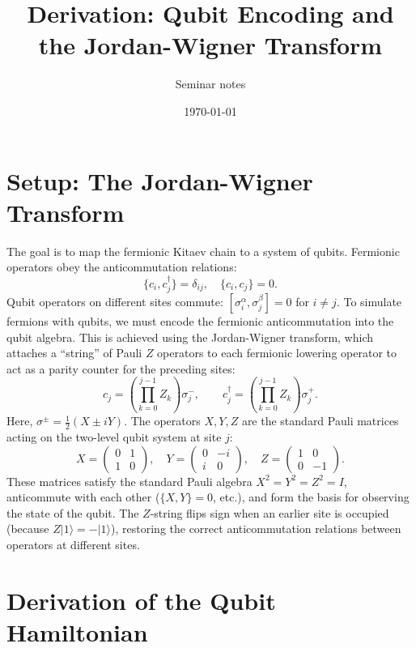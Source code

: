\documentclass[11pt]{article}
\title{Derivation: Qubit Encoding and the Jordan-Wigner Transform}
\author{Seminar notes}
\date{\today}
\begin{document}
\maketitle

\section{Setup: The Jordan-Wigner Transform}

The goal is to map the fermionic Kitaev chain to a system of qubits. Fermionic operators obey the anticommutation relations:
\begin{equation}
  \{c_i, c_j^\dagger\} = \delta_{ij}, \quad \{c_i, c_j\} = 0.
\end{equation}
Qubit operators on different sites commute: $[\sigma_i^\alpha, \sigma_j^\beta] = 0$ for $i \neq j$. To simulate fermions with qubits, we must encode the fermionic anticommutation into the qubit algebra. This is achieved using the Jordan-Wigner transform, which attaches a ``string'' of Pauli $Z$ operators to each fermionic lowering operator to act as a parity counter for the preceding sites:
\begin{equation}
  c_j = \left( \prod_{k=0}^{j-1} Z_k \right) \sigma_j^-, \qquad
  c_j^\dagger = \left( \prod_{k=0}^{j-1} Z_k \right) \sigma_j^+.
\end{equation}
Here, $\sigma^\pm = \frac{1}{2}(X \pm iY)$. The operators $X, Y, Z$ are the standard Pauli matrices acting on the two-level qubit system at site $j$:
\begin{equation}
  X = \begin{pmatrix} 0 & 1 \\ 1 & 0 \end{pmatrix}, \quad
  Y = \begin{pmatrix} 0 & -i \\ i & 0 \end{pmatrix}, \quad
  Z = \begin{pmatrix} 1 & 0 \\ 0 & -1 \end{pmatrix}.
\end{equation}
These matrices satisfy the standard Pauli algebra $X^2 = Y^2 = Z^2 = I$, anticommute with each other ($\{X, Y\} = 0$, etc.), and form the basis for observing the state of the qubit. The $Z$-string flips sign when an earlier site is occupied (because $Z |1\rangle = -|1\rangle$), restoring the correct anticommutation relations between operators at different sites.

\section{Derivation of the Qubit Hamiltonian}
\end{document}
